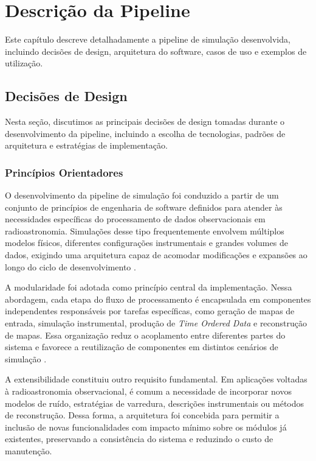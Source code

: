 
\chapter{Descrição da Pipeline}
Este capítulo descreve detalhadamente a pipeline de simulação desenvolvida, incluindo decisões de design, arquitetura do software, casos de uso e exemplos de utilização.

\section{Decisões de Design}
Nesta seção, discutimos as principais decisões de design tomadas durante o desenvolvimento da pipeline, incluindo a escolha de tecnologias, padrões de arquitetura e estratégias de implementação.

\subsection{Princípios Orientadores}
O desenvolvimento da pipeline de simulação foi conduzido a partir de um conjunto de princípios de engenharia de software definidos para atender às necessidades específicas do processamento de dados observacionais em radioastronomia. Simulações desse tipo frequentemente envolvem múltiplos modelos físicos, diferentes configurações instrumentais e grandes volumes de dados, exigindo uma arquitetura capaz de acomodar modificações e expansões ao longo do ciclo de desenvolvimento \cite{sharma2025karabo}.

A modularidade foi adotada como princípio central da implementação. Nessa abordagem, cada etapa do fluxo de processamento é encapsulada em componentes independentes responsáveis por tarefas específicas, como geração de mapas de entrada, simulação instrumental, produção de \textit{Time Ordered Data} e reconstrução de mapas. Essa organização reduz o acoplamento entre diferentes partes do sistema e favorece a reutilização de componentes em distintos cenários de simulação \cite{martin2008cleancode}.

A extensibilidade constituiu outro requisito fundamental. Em aplicações voltadas à radioastronomia observacional, é comum a necessidade de incorporar novos modelos de ruído, estratégias de varredura, descrições instrumentais ou métodos de reconstrução. Dessa forma, a arquitetura foi concebida para permitir a inclusão de novas funcionalidades com impacto mínimo sobre os módulos já existentes, preservando a consistência do sistema e reduzindo o custo de manutenção.

